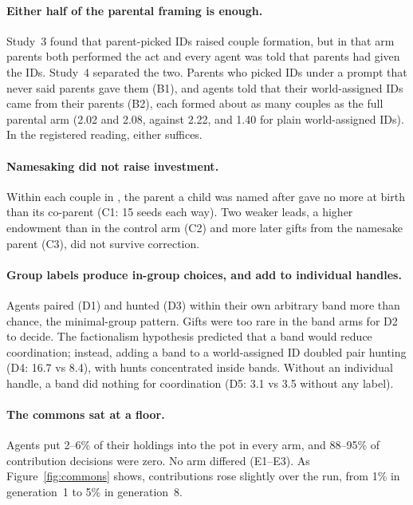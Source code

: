 

\paragraph{Either half of the parental framing is enough.} Study~3 found that parent-picked IDs
raised couple formation, but in that arm parents both performed the act and every agent was told
that parents had given the IDs. Study~4 separated the two. Parents who picked IDs under a prompt
that never said parents gave them (B1), and agents told that their world-assigned IDs came from
their parents (B2), each formed about as many couples as the full parental arm (2.02 and 2.08,
against 2.22, and 1.40 for plain world-assigned IDs). In the registered reading, either suffices.

\paragraph{Namesaking did not raise investment.} Within each couple in , the
parent a child was named after gave no more at birth than its co-parent (C1: 15 seeds each way).
Two weaker leads, a higher endowment than in the control arm (C2) and more later gifts from the
namesake parent (C3), did not survive correction.

\paragraph{Group labels produce in-group choices, and add to individual handles.} Agents paired
(D1) and hunted (D3) within their own arbitrary band more than chance, the minimal-group pattern.
Gifts were too rare in the band arms for D2 to decide. The factionalism hypothesis predicted that a
band would reduce coordination; instead, adding a band to a world-assigned ID doubled pair hunting
(D4: 16.7 vs 8.4), with hunts concentrated inside bands. Without an individual handle, a band did
nothing for coordination (D5: 3.1 vs 3.5 without any label).

\paragraph{The commons sat at a floor.} Agents put 2--6\% of their holdings into the pot in every
arm, and 88--95\% of contribution decisions were zero. No arm differed (E1--E3). As
Figure~\ref{fig:commons} shows, contributions rose slightly over the run, from 1\% in
generation~1 to 5\% in generation~8.

